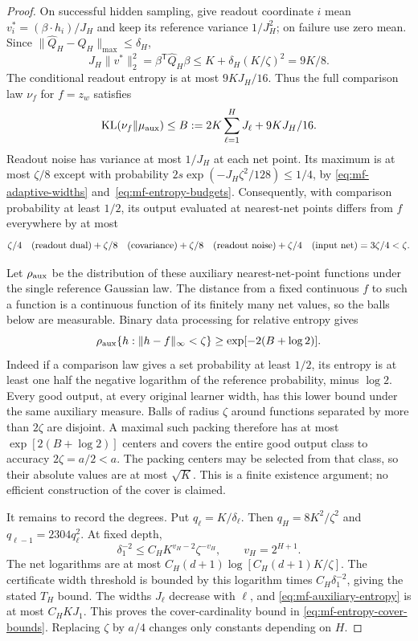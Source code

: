\begin{proof}
On successful hidden sampling, give readout coordinate $i$ mean
$v_i^*=(\beta\cdot h_i)/J_H$ and keep its reference variance
$1/J_H^2$; on failure use zero mean.
Since $\|\widehat Q_H-Q_H\|_{\max}\leq\delta_H$,
\[
 J_H\|v^*\|_2^2=\beta^{\mathsf T}\widehat Q_H\beta
       \leq K+\delta_H(K/\zeta)^2=9K/8.
\]
The conditional readout entropy is at most $9KJ_H/16$.
Thus the full comparison law $\nu_f$ for $f=z_w$ satisfies
\begin{equation}
 \operatorname{KL}(\nu_f\Vert\mu_{\rm aux})
 \leq B:=2K\sum_{\ell=1}^H J_\ell+9KJ_H/16.
 \label{eq:mf-auxiliary-entropy}
\end{equation}
Readout noise has variance at most $1/J_H$ at each net point.
Its maximum is at most $\zeta/8$ except with probability
$2s\exp(-J_H\zeta^2/128)\leq1/4$, by
\eqref{eq:mf-adaptive-widths} and~\eqref{eq:mf-entropy-budgets}.
Consequently, with comparison probability at least $1/2$, its output
evaluated at nearest-net points differs from $f$ everywhere by at most
\[
 \zeta/4\quad\hbox{(readout dual)}
 +\zeta/8\quad\hbox{(covariance)}
 +\zeta/8\quad\hbox{(readout noise)}
 +\zeta/4\quad\hbox{(input net)}
 =3\zeta/4<\zeta.
\]

Let $\rho_{\rm aux}$ be the distribution of these auxiliary
nearest-net-point functions under the single reference Gaussian law.
The distance from a fixed continuous $f$ to such a function is a
continuous function of its finitely many net values, so the balls
below are measurable.  Binary data processing for relative entropy gives
\[
 \rho_{\rm aux}\{h:\|h-f\|_\infty<\zeta\}
       \geq\exp[-2(B+\log2)].
\]
Indeed if a comparison law gives a set probability at least $1/2$,
its entropy is at least one half the negative logarithm of the
reference probability, minus $\log2$.
Every good output, at every original learner width, has this lower
bound under the same auxiliary measure.
Balls of radius $\zeta$ around functions separated by more than
$2\zeta$ are disjoint.  A maximal such packing therefore has at most
$\exp[2(B+\log2)]$ centers and covers the entire good output class
to accuracy $2\zeta=a/2<a$.
The packing centers may be selected from that class, so their absolute
values are at most $\sqrt K$.
This is a finite existence argument; no efficient construction of the
cover is claimed.

It remains to record the degrees.  Put $q_\ell=K/\delta_\ell$.
Then $q_H=8K^2/\zeta^2$ and
$q_{\ell-1}=2304q_\ell^2$.
At fixed depth,
\[
 \delta_1^{-2}\leq C_H K^{v_H-2}\zeta^{-v_H},
 \qquad v_H=2^{H+1}.
\]
The net logarithms are at most
$C_H(d+1)\log[C_H(d+1)K/\zeta]$.
The certificate width threshold is bounded by this logarithm times
$C_H\delta_1^{-2}$, giving the stated $T_H$ bound.
The widths $J_\ell$ decrease with $\ell$, and
\eqref{eq:mf-auxiliary-entropy} is at most $C_HKJ_1$.
This proves the cover-cardinality bound in
\eqref{eq:mf-entropy-cover-bounds}.  Replacing $\zeta$ by $a/4$
changes only constants depending on $H$.
\end{proof}
